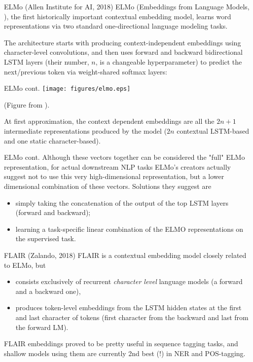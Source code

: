\documentclass[style=upen, size=14pt]{powerdot}
\theoremstyle{definition}
\begin{document}
\begin{slide}[toc=ELMo]{ELMo (Allen Institute for AI, 2018)}
  ELMo (Embeddings from Language Models, \cite{peters2018deep}), the
  first historically important contextual embedding model, learns word
  representations via two standard one-directional language modeling
  tasks.\bigskip

  The architecture starts with producing context-independent embeddings using
  character-level convolutions, and then uses forward and backward bidirectional
  LSTM layers (their number, $n$, is a changeable hyperparameter) to predict the
  next/previous token via weight-shared softmax layers:
\end{slide}

\begin{slide}[toc=]{ELMo cont.}
  \hspace{0.3cm}\texttt{[image: figures/elmo.eps]}

  \footnotesize{\hspace{3.3cm}(Figure from \cite{peters2018deep}).}
  
  \normalsize At first approximation, the context dependent embeddings are all
  the $2n +1 $ intermediate representations produced by the model ($2n$
  contextual LSTM-based and one static character-based).
\end{slide}

\begin{slide}[toc=]{ELMo cont.}
  Although these vectors together can be considered the "full" ELMo
  representation, for actual downstream NLP tasks ELMo's creators actually
  suggest not to use this very high-dimensional representation, but a lower
  dimensional combination of these vectors. Solutions they suggest are
  \begin{itemize}
  \item simply taking the concatenation of the output of the top LSTM layers (forward
    and backward);
  \item learning a task-specific linear combination of the ELMO representations on
    the supervised task.
  \end{itemize}
\end{slide}

\begin{slide}[toc=FLAIR]{FLAIR (Zalando, 2018)}
  FLAIR \citep{akbik2018contextual} is a contextual embedding model closely
  related to ELMo, but 
  \begin{itemize}
  \item consists exclusively of recurrent \emph{character level} language models
    (a forward and a backward one),
  \item produces token-level embeddings from the LSTM hidden states at the
    first and last character of tokens (first character from the backward and
    last from the forward LM).
  \end{itemize}
  FLAIR embeddings proved to be pretty useful in sequence tagging tasks, and
  shallow models using them are currently 2nd best (!) in NER and POS-tagging.
\end{slide}
\end{document}

